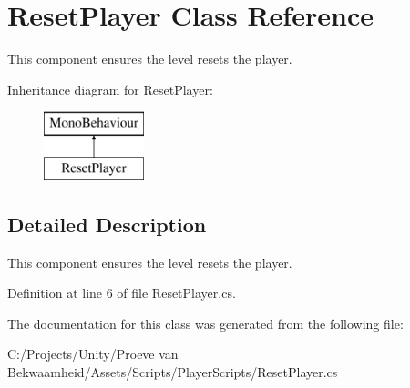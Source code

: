 \hypertarget{class_reset_player}{\section{Reset\+Player Class Reference}
\label{class_reset_player}
}


This component ensures the level resets the player.  


Inheritance diagram for Reset\+Player\+:\begin{figure}[H]
\begin{center}
\leavevmode
\includegraphics[height=2.000000cm]{class_reset_player}
\end{center}
\end{figure}


\subsection{Detailed Description}
This component ensures the level resets the player. 



Definition at line 6 of file Reset\+Player.\+cs.



The documentation for this class was generated from the following file\+:\begin{DoxyCompactItemize}
\item 
C\+:/\+Projects/\+Unity/\+Proeve van Bekwaamheid/\+Assets/\+Scripts/\+Player\+Scripts/Reset\+Player.\+cs\end{DoxyCompactItemize}
